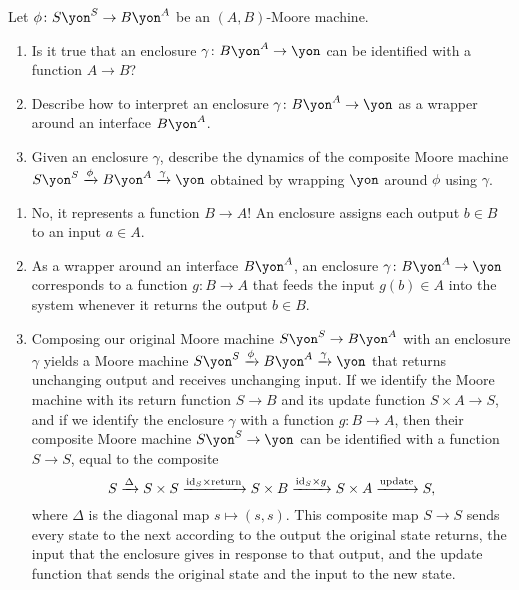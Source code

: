 \documentclass[Book-Poly]{subfiles}
\begin{document}
\begin{exercise} \label{exc.enclosures_as_functions}
Let $\phi\colon S\yon^S\to B\yon^A$ be an $(A,B)$-Moore machine.
\begin{enumerate}
	\item Is it true that an enclosure $\gamma\colon B\yon^A\to\yon$ can be identified with a function $A\to B$?
	\item Describe how to interpret an enclosure $\gamma\colon B\yon^A\to\yon$ as a wrapper around an interface $B\yon^A$.
	\item Given an enclosure $\gamma$, describe the dynamics of the composite Moore machine $S\yon^S\To{\phi}B\yon^A\To{\gamma}\yon$ obtained by wrapping $\yon$ around $\phi$ using $\gamma$.
\qedhere
\end{enumerate}
\begin{solution}
\begin{enumerate}
	\item No, it represents a function $B\to A$!
	An enclosure assigns each output $b\in B$ to an input $a\in A$.
	\item As a wrapper around an interface $B\yon^A$, an enclosure $\gamma\colon B\yon^A\to\yon$ corresponds to a function $g\colon B\to A$ that feeds the input $g(b)\in A$ into the system whenever it returns the output $b\in B$.
	\item Composing our original Moore machine $S\yon^S\to B\yon^A$ with an enclosure $\gamma$ yields a Moore machine $S\yon^S\To{\phi}B\yon^A\To{\gamma}\yon$ that returns unchanging output and receives unchanging input.
	If we identify the Moore machine with its return function $S\to B$ and its update function $S\times A\to S$, and if we identify the enclosure $\gamma$ with a function $g\colon B\to A$, then their composite Moore machine $S\yon^S\to\yon$ can be identified with a function $S\to S$, equal to the composite
	\[
	    S\xrightarrow{\Delta}S\times S\xrightarrow{\mathrm{id}_S\times\text{return}}S\times B\xrightarrow{\mathrm{id}_S\times g}S\times A\xrightarrow{\text{update}}S,
	\]
	where $\Delta$ is the diagonal map $s\mapsto(s,s)$.
	This composite map $S\to S$ sends every state to the next according to the output the original state returns, the input that the enclosure gives in response to that output, and the update function that sends the original state and the input to the new state.
\end{enumerate}
\end{solution}
\end{exercise}
\end{document}
